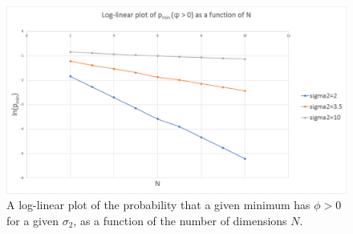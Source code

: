 \documentclass[12pt]{article}
\begin{document}



\begin{figure} 
  \centering
  \includegraphics[width=\linewidth]{Log-linear.png}
  \caption{A log-linear plot of the probability that a given minimum has $\phi > 0$ for a given $\sigma_2$, as a function of the number of dimensions $N$.}
  \label{Log-Linear}
\end{figure}
\end{document}
